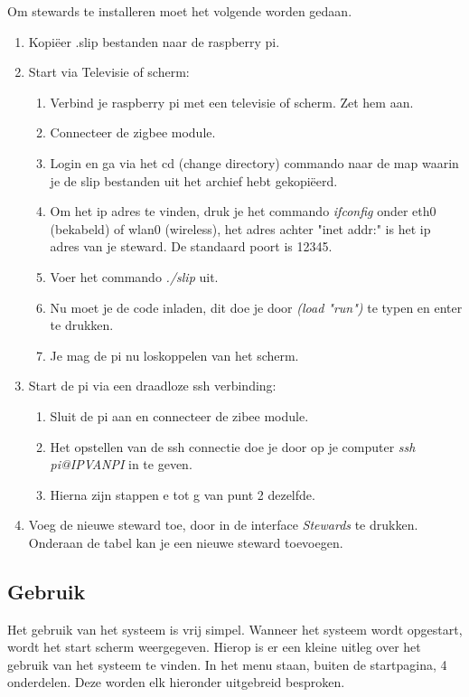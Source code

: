 \documentclass{article}
\begin{document}
Om stewards te installeren moet het volgende worden gedaan.
\begin{enumerate}
	\item Kopi\"eer .slip bestanden naar de raspberry pi.
	\item Start via Televisie of scherm: 
	\begin{enumerate}
		\item Verbind je raspberry pi met een televisie of scherm. Zet hem aan.
		\item Connecteer de zigbee module.
		\item Login en ga via het cd (change directory) commando naar de map waarin je de slip bestanden uit het archief hebt gekopi\"eerd.
		\item Om het ip adres te vinden, druk je het commando \emph{ifconfig} onder eth0 (bekabeld) of wlan0 (wireless), het adres achter "inet addr:" is het ip adres van je steward. De standaard poort is 12345.
		\item Voer het commando \emph{./slip} uit.
		\item Nu moet je de code inladen, dit doe je door \emph{(load "run")} te typen en enter te drukken. 
		\item Je mag de pi nu loskoppelen van het scherm.
	\end{enumerate}
	\item Start de pi via een draadloze ssh verbinding:
	\begin{enumerate}
		\item Sluit de pi aan en connecteer de zibee module.
		\item Het opstellen van de ssh connectie doe je door op je computer \emph{ssh pi@IPVANPI} in te geven.
		\item Hierna zijn stappen e tot g van punt 2 dezelfde.
	\end{enumerate}
	\item Voeg de nieuwe steward toe, door in de interface \emph{Stewards} te drukken. Onderaan de tabel kan je een nieuwe steward toevoegen.
\end{enumerate}

\subsection{Gebruik}
\label{sub:usage}
Het gebruik van het systeem is vrij simpel. Wanneer het systeem wordt opgestart, wordt het start scherm weergegeven. Hierop is er een kleine uitleg over het gebruik van het systeem te vinden. In het menu staan, buiten de startpagina,  4 onderdelen. Deze worden elk hieronder uitgebreid besproken. \\
\end{document}
